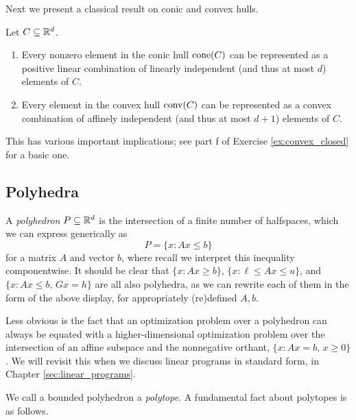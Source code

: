 Next we present a classical result on conic and convex hulls.

\begin{Theorem}
\label{thm:caratheodory}
Let $C \subseteq \mathbb{R}^d$.

\begin{enumerate}[label=(\roman*)]
\item Every nonzero element in the conic hull $\operatorname{cone}(C)$ can be represented as a
  positive linear combination of linearly independent (and thus at most $d$)
  elements of $C$.  

\item Every element in the convex hull $\operatorname{conv}(C)$ can be represented as a convex
  combination of affinely independent (and thus at most $d+1$) elements of $C$.  
\end{enumerate}
\end{Theorem}


This has various important implications; see part f of Exercise
\ref{ex:convex_closed} for a basic one. 

\subsection{Polyhedra}
\label{sec:polyhedra}

A \emph{polyhedron} $P \subseteq \mathbb{R}^d$ is the intersection of a finite number of
halfspaces, which we can express generically as 
\[
P = \{x : Ax \leq b\}
\] 
for a matrix $A$ and vector $b$, where recall we interpret this inequality
componentwise. It should be clear that $\{x : Ax \geq b\}$, $\{x : \ell \leq Ax
\leq u\}$, and $\{x : Ax \leq b, \, Gx = h\}$ are all also polyhedra, as we
can rewrite each of them in the form of the above display, for appropriately
(re)defined $A,b$.

Less obvious is the fact that an optimization problem over a polyhedron can
always be equated with a higher-dimensional optimization problem over the
intersection of an affine subspace and the nonnegative orthant, $\{x : Ax=b, \,
x \geq 0 \}$. We will revisit this when we discuss linear programs in standard
form, in Chapter \ref{sec:linear_programs}. 

We call a bounded polyhedron a \emph{polytope}. A fundamental fact about
polytopes is as follows. 

